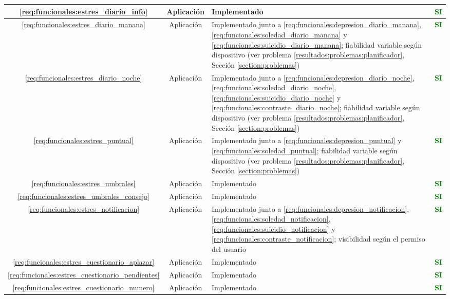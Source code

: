 \begin{xltabular}{\textwidth}{|c|c|X|c|}
        \ref{req:funcionales:estres_diario_info} & Aplicación & Implementado & \textcolor{green}{\textbf{SI}} \\
        \hline
        \ref{req:funcionales:estres_diario_manana} & Aplicación & Implementado junto a \ref{req:funcionales:depresion_diario_manana}, \ref{req:funcionales:soledad_diario_manana} y \ref{req:funcionales:suicidio_diario_manana}; fiabilidad variable según dispositivo (ver problema \ref{resultados:problemas:planificador}, Sección \ref{section:problemas}) & \textcolor{green}{\textbf{SI}} \\
        \hline
        \ref{req:funcionales:estres_diario_noche} & Aplicación & Implementado junto a \ref{req:funcionales:depresion_diario_noche}, \ref{req:funcionales:soledad_diario_noche},  \ref{req:funcionales:suicidio_diario_noche} y \ref{req:funcionales:contraste_diario_noche}; fiabilidad variable según dispositivo (ver problema \ref{resultados:problemas:planificador}, Sección \ref{section:problemas}) & \textcolor{green}{\textbf{SI}} \\
        \hline
        \ref{req:funcionales:estres_puntual} & Aplicación & Implementado junto a \ref{req:funcionales:depresion_puntual} y \ref{req:funcionales:soledad_puntual}; fiabilidad variable según dispositivo (ver problema \ref{resultados:problemas:planificador}, Sección \ref{section:problemas}) & \textcolor{green}{\textbf{SI}} \\
        \hline
        \ref{req:funcionales:estres_umbrales} & Aplicación & Implementado & \textcolor{green}{\textbf{SI}} \\
        \hline
        \ref{req:funcionales:estres_umbrales_consejo} & Aplicación & Implementado & \textcolor{green}{\textbf{SI}} \\
        \hline
        \ref{req:funcionales:estres_notificacion} & Aplicación & Implementado junto a \ref{req:funcionales:depresion_notificacion}, \ref{req:funcionales:soledad_notificacion}, \ref{req:funcionales:suicidio_notificacion} y \ref{req:funcionales:contraste_notificacion}; visibilidad según el permiso del usuario & \textcolor{green}{\textbf{SI}} \\
        \hline
        \ref{req:funcionales:estres_cuestionario_aplazar} & Aplicación & Implementado & \textcolor{green}{\textbf{SI}} \\
        \hline
        \ref{req:funcionales:estres_cuestionario_pendientes} & Aplicación & Implementado & \textcolor{green}{\textbf{SI}} \\
        \hline
        \ref{req:funcionales:estres_cuestionario_numero} & Aplicación & Implementado & \textcolor{green}{\textbf{SI}} \\

\end{xltabular}
